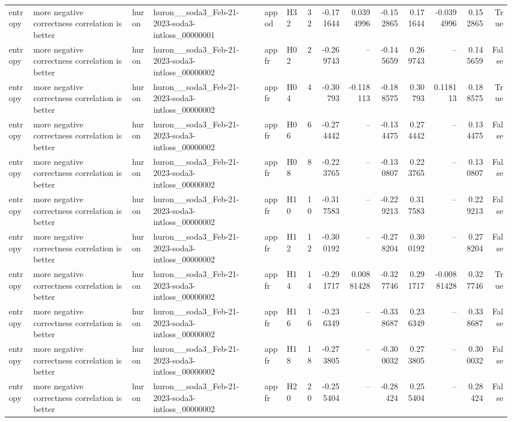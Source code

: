 \begin{longtable}{llllllrrrrrrrr}
entropy & more negative correctness correlation is better & huron & huron\_\_soda3\_Feb-21-2023-soda3-intloss\_00000001 & appod & H32 & 32 & -0.171644 & 0.0394996 & -0.152865 & 0.171644 & -0.0394996 & 0.152865 & True \\
entropy & more negative correctness correlation is better & huron & huron\_\_soda3\_Feb-21-2023-soda3-intloss\_00000002 & appfr & H02 & 2 & -0.269743 & -- & -0.145659 & 0.269743 & -- & 0.145659 & False \\
entropy & more negative correctness correlation is better & huron & huron\_\_soda3\_Feb-21-2023-soda3-intloss\_00000002 & appfr & H04 & 4 & -0.30793 & -0.118113 & -0.188575 & 0.30793 & 0.118113 & 0.188575 & True \\
entropy & more negative correctness correlation is better & huron & huron\_\_soda3\_Feb-21-2023-soda3-intloss\_00000002 & appfr & H06 & 6 & -0.274442 & -- & -0.134475 & 0.274442 & -- & 0.134475 & False \\
entropy & more negative correctness correlation is better & huron & huron\_\_soda3\_Feb-21-2023-soda3-intloss\_00000002 & appfr & H08 & 8 & -0.223765 & -- & -0.130807 & 0.223765 & -- & 0.130807 & False \\
entropy & more negative correctness correlation is better & huron & huron\_\_soda3\_Feb-21-2023-soda3-intloss\_00000002 & appfr & H10 & 10 & -0.317583 & -- & -0.229213 & 0.317583 & -- & 0.229213 & False \\
entropy & more negative correctness correlation is better & huron & huron\_\_soda3\_Feb-21-2023-soda3-intloss\_00000002 & appfr & H12 & 12 & -0.300192 & -- & -0.278204 & 0.300192 & -- & 0.278204 & False \\
entropy & more negative correctness correlation is better & huron & huron\_\_soda3\_Feb-21-2023-soda3-intloss\_00000002 & appfr & H14 & 14 & -0.291717 & 0.00881428 & -0.327746 & 0.291717 & -0.00881428 & 0.327746 & True \\
entropy & more negative correctness correlation is better & huron & huron\_\_soda3\_Feb-21-2023-soda3-intloss\_00000002 & appfr & H16 & 16 & -0.236349 & -- & -0.338687 & 0.236349 & -- & 0.338687 & False \\
entropy & more negative correctness correlation is better & huron & huron\_\_soda3\_Feb-21-2023-soda3-intloss\_00000002 & appfr & H18 & 18 & -0.273805 & -- & -0.300032 & 0.273805 & -- & 0.300032 & False \\
entropy & more negative correctness correlation is better & huron & huron\_\_soda3\_Feb-21-2023-soda3-intloss\_00000002 & appfr & H20 & 20 & -0.255404 & -- & -0.28424 & 0.255404 & -- & 0.28424 & False \\

\end{longtable}
